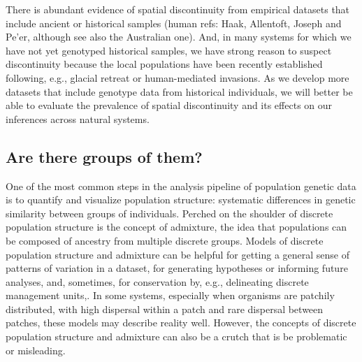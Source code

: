 \documentclass{ar-1col}
\newcommand{\todo}[1]{{\textbf{\color{red}{#1}}}}
\begin{document}
There is abundant evidence of spatial discontinuity 
from empirical datasets that include ancient or historical samples 
(human refs: Haak, Allentoft, Joseph and Pe'er, 
although see also the Australian one).
And, in many systems for which we have not yet genotyped historical samples, 
we have strong reason to suspect discontinuity 
because the local populations have been recently established 
following, e.g., glacial retreat or human-mediated invasions.
As we develop more datasets that include genotype data from historical individuals, 
we will better be able to evaluate the prevalence of spatial discontinuity 
and its effects on our inferences across natural systems. 

\todo{read through and edit}

\subsection{Are there groups of them?}
One of the most common steps in the analysis pipeline of population genetic data
is to quantify and visualize population structure:
systematic differences in genetic similarity between groups of individuals.
Perched on the shoulder of discrete population structure is the concept of admixture,
the idea that populations can be composed of ancestry from multiple discrete groups.
Models of discrete population structure and admixture 
can be helpful for getting a general sense of patterns of variation in a dataset, 
for generating hypotheses or informing future analyses, 
and, sometimes, for conservation by, 
e.g., delineating discrete management units,.
In some systems, 
especially when organisms are patchily distributed, 
with high dispersal within a patch and rare dispersal between patches,
these models may describe reality well.
However, 
the concepts of discrete population structure and admixture 
can also be a crutch that is be problematic or misleading.
\end{document}
